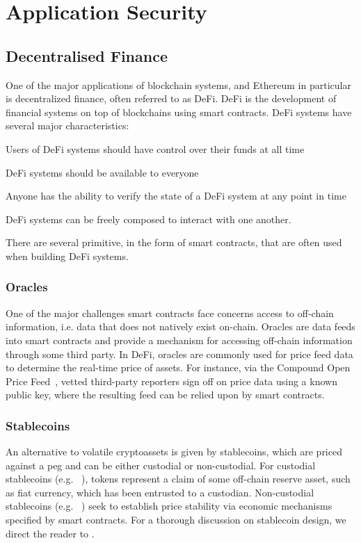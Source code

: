 \chapter{Application Security}
\label{ch:application-security}

\section{Decentralised Finance}
One of the major applications of blockchain systems, and Ethereum in particular is decentralized finance, often referred to as DeFi.
DeFi is the development of financial systems on top of blockchains using smart contracts.
DeFi systems have several major characteristics:
\begin{description}
  \setlength{\baselineskip}{15pt}
\item[Non-custodial] Users of DeFi systems should have control over their funds at all time
\item[Permisionless] DeFi systems should be available to everyone
\item[Openly auditable] Anyone has the ability to verify the state of a DeFi system at any point in time
\item[Composable] DeFi systems can be freely composed to interact with one another.
\end{description}

There are several primitive, in the form of smart contracts, that are often used when building DeFi systems.

\subsection{Oracles}
One of the major challenges smart contracts face concerns access to off-chain information, i.e. data that does not natively exist on-chain.
Oracles are data feeds into smart contracts and provide a mechanism for accessing off-chain information through some third party.
In DeFi, oracles are commonly used for price feed data to determine the real-time price of assets.
For instance, via the Compound Open Price Feed~\cite{web:compoundfinance_prices}, vetted third-party reporters sign off on price data using a known public key, where the resulting feed can be relied upon by smart contracts.

\subsection{Stablecoins}
An alternative to volatile cryptoassets is given by stablecoins, which are priced against a peg and can be either custodial or non-custodial.
For custodial stablecoins (e.g. ~\cite{web:usdc}), tokens represent a claim of some off-chain reserve asset, such as fiat currency, which has been entrusted to a custodian.
Non-custodial stablecoins (e.g. ~\cite{whitepaper:maker}) seek to establish price stability via economic mechanisms specified by smart contracts.
For a thorough discussion on stablecoin design, we direct the reader to \cite{Klages-Mundt2020}.






